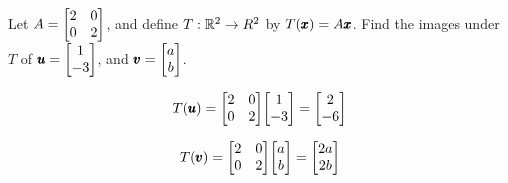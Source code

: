 \documentclass{../mathhomework}
\newenvironment{Mat}{\begin{bmatrix}}{\end{bmatrix}}
\begin{document}
\begin{problem}[1.8\#1]
    Let $A = \begin{Mat}
        2 & 0 \\
        0 & 2
    \end{Mat}$, and define $T: \mathbb{R}^2 \to R^2$ by $T(\pmb{x}) = A\pmb{x}$. Find the images under $T$ of $\Vect{u} = \begin{Mat}
        1 \\ -3
    \end{Mat}$, and $\Vect{v} = \begin{Mat}
        a \\ b
    \end{Mat}$.

    \begin{solution}
        \begin{equation*}
            T(\Vect{u}) = \begin{Mat}
                2 & 0 \\ 
                0 & 2
            \end{Mat} \begin{Mat}
                1 \\ -3
            \end{Mat} = \begin{Mat}
                2 \\ -6
            \end{Mat}
        \end{equation*}

        \begin{equation*}
            T(\Vect{v}) = \begin{Mat}
                2 & 0 \\ 
                0 & 2
            \end{Mat} \begin{Mat}
                a \\ b
            \end{Mat} = \begin{Mat}
                2a \\ 2b
            \end{Mat}
        \end{equation*}
    \end{solution}
\end{problem}
\end{document}
